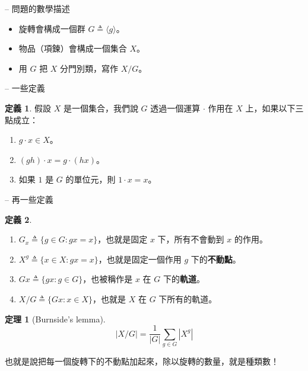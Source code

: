 \documentclass[notheorems,xcolor=dvipsnames]{beamer}
\newcommand\abs[1]{\left\lvert #1 \right\rvert}
\newcommand*{\defeq}{\triangleq}
\theoremstyle{definition}
\newtheorem{theorem}{定理}
\newtheorem{definition}{定義}
\renewcommand*{\emph}[1]{{\bf #1}}
\begin{document}
\begin{frame}{{\secname} -- 問題的數學描述}
  \begin{itemize}[<+->]
    \item 旋轉會構成一個群 $G \defeq \langle g \rangle$。
    \item 物品（項鍊）會構成一個集合 $X$。
    \item 用 $G$ 把 $X$ 分門別類，寫作 $X / G$。
  \end{itemize}
\end{frame}

\begin{frame}{{\secname} -- 一些定義}
\begin{definition}
假設 $X$ 是一個集合，我們說 $G$ 透過一個運算 $\cdot$ 作用在 $X$ 上，如果以下三點成立：\pause
\begin{enumerate}[<+->]
  \item $g \cdot x \in X$。
  \item $(gh) \cdot x = g \cdot (hx)$。
  \item 如果 $1$ 是 $G$ 的單位元，則 $1 \cdot x = x$。
\end{enumerate}
\end{definition}
\end{frame}

\begin{frame}{{\secname} -- 再一些定義}
\begin{definition}
\begin{enumerate}[<+->]
  \item $G_x \defeq \{ g \in G : g x = x \}$，也就是固定 $x$ 下，所有不會動到 $x$ 的作用。
  \item $X^g \defeq \{ x \in X : g x = x \}$，也就是固定一個作用 $g$ 下的\emph{不動點}。
  \item $G x \defeq \{ gx : g \in G \}$，也被稱作是 $x$ 在 $G$ 下的\emph{軌道}。
  \item $X / G \defeq \{ Gx : x \in X \}$，也就是 $X$ 在 $G$ 下所有的軌道。
\end{enumerate}
\end{definition}
\end{frame}

\begin{frame}{{\secname}}
  \begin{theorem}[Burnside's lemma] \vspace{-1em}
  \[ \abs{X / G} = \frac{1}{\abs{G}} \sum_{g \in G} \abs{X^g} \]
  \end{theorem}\pause

  \medskip
  也就是說把每一個旋轉下的不動點加起來，除以旋轉的數量，就是種類數！
\end{frame}
\end{document}
